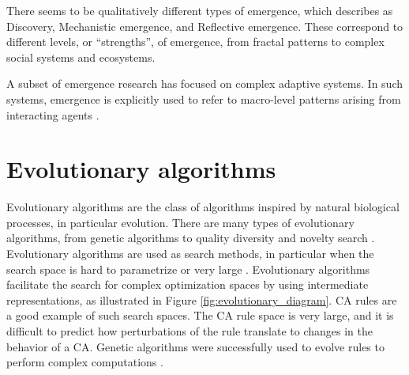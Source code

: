 There seems to be qualitatively different types of emergence, which
\textcite{dehaanHowEmergenceArises2006} describes as Discovery, Mechanistic
emergence, and Reflective emergence. These correspond to different levels, or
``strengths'', of emergence, from fractal patterns to complex social systems and
ecosystems.

A subset of emergence research has focused on complex adaptive systems. In
such systems, emergence is explicitly used to refer to macro-level patterns
arising from interacting agents \parencite{hollandEmergenceChaosOrder2000,
  kauffmanHomeUniverseSearch1995, langtonStudyingArtificialLife1986}.


\section{Evolutionary algorithms}\label{sec:evol-algor}
Evolutionary algorithms are the class of algorithms inspired by natural
biological processes, in particular evolution. There are many types of
evolutionary algorithms, from genetic algorithms to quality diversity and
novelty search \parencite{lehmanAbandoningObjectivesEvolution2011,
  lehmanEvolvingDiversityVirtual2011}. Evolutionary algorithms are used as
search methods, in particular when the search space is hard to parametrize or
very large \parencite{poliRelationsSearchEvolutionary1996}. Evolutionary
algorithms facilitate the search for complex optimization spaces by using intermediate
representations, as illustrated in Figure \ref{fig:evolutionary_diagram}.
\ac{CA} rules are a good example of such search spaces. The \ac{CA} rule space is
very large, and it is difficult to predict how perturbations of the rule
translate to changes in the behavior of a \ac{CA}. Genetic algorithms were
successfully used to evolve rules to perform complex computations
\parencite{mitchellEvolvingCellularAutomata1996}.

